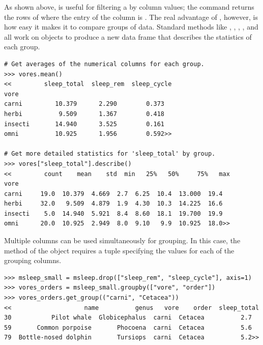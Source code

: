 As shown above,  is useful for filtering a  by column values;
the command  returns the rows of  where the entry of the  column is .
The real advantage of , however, is how easy it makes it to compare groups of data.
Standard  methods like , , , , and  all work on  objects to produce a new data frame that describes the statistics of each group.

\begin{lstlisting}
# Get averages of the numerical columns for each group.
>>> vores.mean()
<<         sleep_total  sleep_rem  sleep_cycle
vore
carni         10.379      2.290        0.373
herbi          9.509      1.367        0.418
insecti       14.940      3.525        0.161
omni          10.925      1.956        0.592>>

# Get more detailed statistics for 'sleep_total' by group.
>>> vores["sleep_total"].describe()
<<         count    mean    std  min   25%   50%     75%   max
vore
carni     19.0  10.379  4.669  2.7  6.25  10.4  13.000  19.4
herbi     32.0   9.509  4.879  1.9  4.30  10.3  14.225  16.6
insecti    5.0  14.940  5.921  8.4  8.60  18.1  19.700  19.9
omni      20.0  10.925  2.949  8.0  9.10   9.9  10.925  18.0>>
\end{lstlisting}

Multiple columns can be used simultaneously for grouping.
In this case, the  method of the  object requires a tuple specifying the values for each of the grouping columns.

\begin{lstlisting}
>>> msleep_small = msleep.drop(["sleep_rem", "sleep_cycle"], axis=1)
>>> vores_orders = msleep_small.groupby(["vore", "order"])
>>> vores_orders.get_group(("carni", "Cetacea"))
<<                    name          genus   vore    order  sleep_total
30           Pilot whale  Globicephalus  carni  Cetacea          2.7
59       Common porpoise       Phocoena  carni  Cetacea          5.6
79  Bottle-nosed dolphin       Tursiops  carni  Cetacea          5.2>>
\end{lstlisting}

